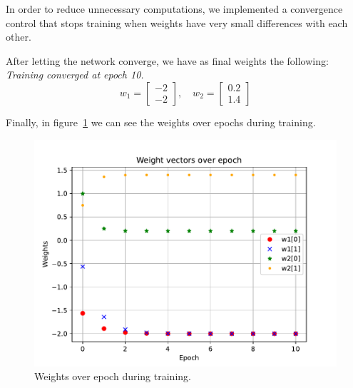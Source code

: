 In order to reduce unnecessary computations, we implemented a convergence control that stops training when weights have very small differences with each other.

After letting the network converge, we have as final weights the following:\\
\textit{\small Training converged at epoch 10.}
\[
w_1 = \left[
\begin{array}{c}
	-2\\-2
\end{array}
\right], \quad
w_2 = \left[
\begin{array}{c}
	0.2\\1.4
\end{array}
\right]
\] 

Finally, in figure~\ref{fig:prob3_weights_over_epoch} we can see the weights over epochs during training.

\begin{figure}[htpb]
	\centering
	\includegraphics[width=0.47\linewidth]{../Problem 3/prob3_weights_over_epoch.pdf}
	\caption{Weights over epoch during training.}
	\label{fig:prob3_weights_over_epoch}
\end{figure}

